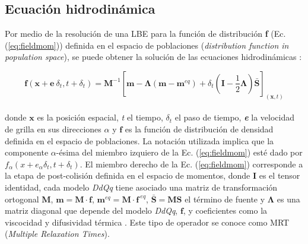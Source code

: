 \subsection{Ecuación hidrodinámica}

Por medio de la resolución de una LBE para la función de distribución \textbf{f} (Ec.(\ref{eq:fieldmom})) definida en el espacio de poblaciones (\textit{distribution function in population space}), se puede obtener la solución de las ecuaciones hidrodinámicas \cite{li2013lattice}:

\begin{equation}
    \mathbf{f}(\mathbf{x} + \mathbf{e} \> \delta_{t} , t + \delta_{t}) = \mathbf{M}^{-1} \left[ \mathbf{m} - \mathbf{\Lambda}(\mathbf{m} - \mathbf{m}^{eq}) + \delta_{t} \left( \mathbf{I} - \frac{1}{2} \mathbf{\Lambda} \right) \mathbf{\bar{S}}  \right]_{(\mathbf{x},t)} 
    \label{eq:fieldmom}
\end{equation}\\
donde $\mathbf{x}$ es la posición espacial, \textit{t} el tiempo, $\delta_{t}$ el paso de tiempo, \textit{\textbf{e}} la velocidad de grilla en sus direcciones $\alpha$ y $\mathbf{f}$ es la función de distribución de densidad definida en el espacio de poblaciones. La notación utilizada implica que la componente $\alpha$-ésima del miembro izquiero de la Ec. (\ref{eq:fieldmom}) esté dado por $f_{\alpha}(x + e_{\alpha} \delta_{t}  , t + \delta_{t} )$. El miembro derecho de la Ec. (\ref{eq:fieldmom}) corresponde a la etapa de post-colisión definida en el espacio de momentos, donde \textbf{I} es el tensor identidad, cada modelo \textit{DdQq} tiene asociado una matriz de transformación ortogonal \textbf{M}, $\mathbf{m} = \mathbf{M} \cdot \mathbf{f}$, $\mathbf{m}^{eq} = \mathbf{M} \cdot \mathbf{f}^{\>eq}$, $\mathbf{\bar{S}} = \mathbf{M} \mathbf{S}$ el término de fuente y $ \mathbf{\Lambda}$ es una matriz diagonal que depende del modelo \textit{DdQq}, $\mathbf{f}$, y coeficientes como la viscocidad y difusividad térmica \cite{succi2018lattice}. Este tipo de operador se conoce como MRT (\textit{Multiple Relaxation Times}).

